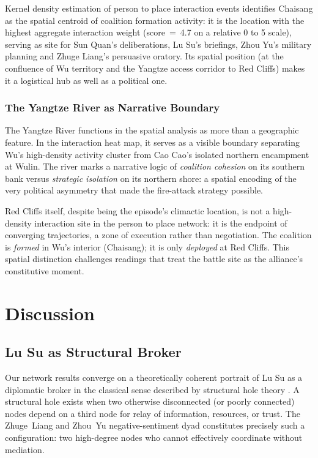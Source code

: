 \documentclass[12pt, a4paper]{article}
\begin{document}
Kernel density estimation of person to place interaction events identifies
Chaisang as the spatial centroid of coalition formation activity:
it is the location with the highest aggregate interaction weight (score~=~4.7
on a relative 0 to 5 scale), serving as site for Sun Quan's deliberations,
Lu Su's briefings, Zhou Yu's military planning and Zhuge Liang's
persuasive oratory.
Its spatial position (at the confluence of Wu territory and the Yangtze
access corridor to Red Cliffs) makes it a logistical hub as well as a
political one.

\subsubsection{The Yangtze River as Narrative Boundary}

The Yangtze River functions in the spatial analysis as more than a
geographic feature.
In the interaction heat map, it serves as a visible boundary separating
Wu's high-density activity cluster from Cao Cao's isolated northern
encampment at Wulin.
The river marks a narrative logic of \emph{coalition cohesion} on its
southern bank versus \emph{strategic isolation} on its northern shore: a
spatial encoding of the very political asymmetry that made the fire-attack
strategy possible.

Red Cliffs itself, despite being the episode's climactic location, is not
a high-density interaction site in the person to place network: it is the
endpoint of converging trajectories, a zone of execution rather than
negotiation.
The coalition is \emph{formed} in Wu's interior (Chaisang); it is only
\emph{deployed} at Red Cliffs.
This spatial distinction challenges readings that treat the battle site as
the alliance's constitutive moment.

\section{Discussion}
\label{sec:discussion}

\subsection{Lu Su as Structural Broker}

Our network results converge on a theoretically coherent portrait of
Lu Su as a diplomatic broker in the classical sense described by
structural hole theory \autocite{burt2004brokerage}.
A structural hole exists when two otherwise disconnected (or poorly
connected) nodes depend on a third node for relay of information,
resources, or trust.
The Zhuge~Liang and Zhou~Yu negative-sentiment dyad constitutes precisely
such a configuration: two high-degree nodes who cannot effectively
coordinate without mediation.
\end{document}
